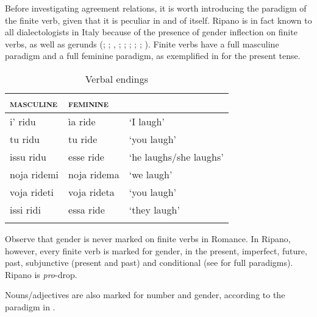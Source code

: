 \documentclass[output=paper
,modfonts
,nonflat]{langsci/langscibook}
\begin{document}
Before investigating agreement relations, it is worth introducing the paradigm of the finite verb, given that it is peculiar in and of itself. Ripano is in fact known to all dialectologists in Italy because of the presence of gender inflection on finite verbs, as well as gerunds (\citealt{Egidi1965}; \citealt{Parrino1967}; \citealt{Luedtke1976}, \citealt{Mancini1988/1997,Mancini1993}; \citealt{Harder1998}; \citealt{Jones2001}; \citealt{Ledgeway2006}; \citealt{Rossi2008}; \citealt{Ferrari_Bridgers2010}). Finite verbs have a full masculine paradigm and a full feminine paradigm, as exemplified in  for the present tense.

\begin{table}
\caption{Verbal endings \citep[31]{Rossi2008}\label{tab-dalessandro:1}}
\begin{tabular}{lll}  
\lsptoprule
    \textsc{masculine} & \textsc{feminine} &\\
\midrule	
i’ ridu & ìa ride & `I laugh'\\     	
tu ridu & tu ride &   `you laugh' \\   	
issu ridu  & esse ride & `he laughs/she laughs'\\  
noja ridemi & noja ridema & `we laugh'\\   	
voja rideti  & voja rideta &  `you laugh' \\  	
issi ridi  & essa ride &  `they laugh'   \\
	\lspbottomrule
\end{tabular}
\end{table}

Observe that gender is never marked on finite verbs in Romance. In Ripano, however, every finite verb is marked for gender, in the present, imperfect, future, past, subjunctive (present and past) and conditional (see \citealt{Rossi2008} for full paradigms). Ripano is \textit{pro}-drop.

Nouns/adjectives are also marked for number and gender, according to the paradigm in .
\end{document}
